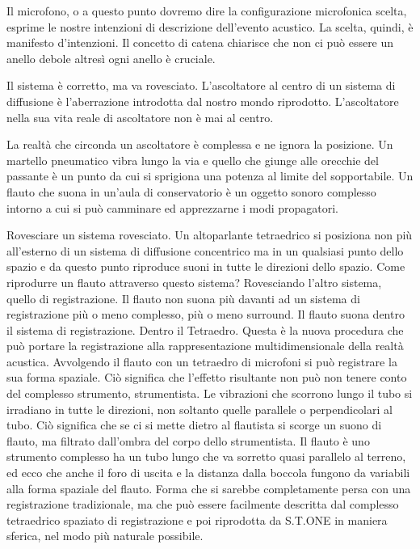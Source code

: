 \documentclass[a4paper,11pt]{article}
\begin{document}
Il microfono, o a questo punto dovremo dire la configurazione
microfonica scelta, esprime le nostre intenzioni di descrizione
dell'evento acustico. La scelta, quindi, è manifesto d'intenzioni. Il
concetto di catena chiarisce che non ci può essere un anello debole
altresì ogni anello è cruciale.

Il sistema è corretto, ma va rovesciato. L'ascoltatore al centro di un
sistema di diffusione è l'aberrazione introdotta dal nostro mondo
riprodotto. L'ascoltatore nella sua vita reale di ascoltatore non è mai
al centro.

La realtà che circonda un ascoltatore è complessa e ne ignora la
posizione. Un martello pneumatico vibra lungo la via e quello che giunge
alle orecchie del passante è un punto da cui si sprigiona una potenza al
limite del sopportabile. Un flauto che suona in un'aula di conservatorio
è un oggetto sonoro complesso intorno a cui si può camminare ed
apprezzarne i modi propagatori.

Rovesciare un sistema rovesciato. Un altoparlante tetraedrico si
posiziona non più all'esterno di un sistema di diffusione concentrico ma
in un qualsiasi punto dello spazio e da questo punto riproduce suoni in
tutte le direzioni dello spazio. Come riprodurre un flauto attraverso
questo sistema? Rovesciando l'altro sistema, quello di registrazione. Il
flauto non suona più davanti ad un sistema di registrazione più o meno
complesso, più o meno surround. Il flauto suona dentro il sistema di
registrazione. Dentro il Tetraedro. Questa è la nuova procedura che può
portare la registrazione alla rappresentazione multidimensionale della
realtà acustica. Avvolgendo il flauto con un tetraedro di microfoni si
può registrare la sua forma spaziale. Ciò significa che l'effetto
risultante non può non tenere conto del complesso strumento,
strumentista. Le vibrazioni che scorrono lungo il tubo si irradiano in
tutte le direzioni, non soltanto quelle parallele o perpendicolari al
tubo. Ciò significa che se ci si mette dietro al flautista si scorge un
suono di flauto, ma filtrato dall'ombra del corpo dello strumentista. Il
flauto è uno strumento complesso ha un tubo lungo che va sorretto quasi
parallelo al terreno, ed ecco che anche il foro di uscita e la distanza
dalla boccola fungono da variabili alla forma spaziale del flauto. Forma
che si sarebbe completamente persa con una registrazione tradizionale,
ma che può essere facilmente descritta dal complesso tetraedrico
spaziato di registrazione e poi riprodotta da S.T.ONE in maniera
sferica, nel modo più naturale possibile.
\end{document}
